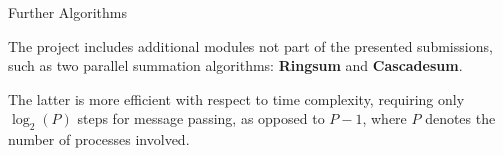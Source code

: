 \begin{chapter}{Further Algorithms}
    \par The project includes additional modules not part of the presented submissions, such as two parallel summation algorithms: \textbf{Ringsum} and \textbf{Cascadesum}.
    \par The latter is more efficient with respect to time complexity, requiring only $\log_2(P)$ steps for message passing, as opposed to $P - 1$, where $P$ denotes the number of processes involved.
\end{chapter}